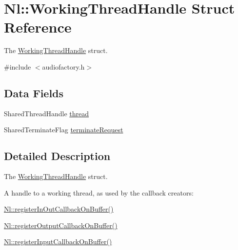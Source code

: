 \hypertarget{structNl_1_1WorkingThreadHandle}{\section{Nl\-:\-:Working\-Thread\-Handle Struct Reference}
\label{structNl_1_1WorkingThreadHandle}
}


The \hyperlink{structNl_1_1WorkingThreadHandle}{Working\-Thread\-Handle} struct.  




{\ttfamily \#include $<$audiofactory.\-h$>$}

\subsection*{Data Fields}
\begin{DoxyCompactItemize}
\item 
Shared\-Thread\-Handle \hyperlink{structNl_1_1WorkingThreadHandle_a8f3a12233057ef18fd8a23e0fe115223}{thread}
\item 
Shared\-Terminate\-Flag \hyperlink{structNl_1_1WorkingThreadHandle_aeaff58df70b1f63bd8a01334cb11eb93}{terminate\-Request}
\end{DoxyCompactItemize}


\subsection{Detailed Description}
The \hyperlink{structNl_1_1WorkingThreadHandle}{Working\-Thread\-Handle} struct. 

A handle to a working thread, as used by the callback creators\-:
\begin{DoxyItemize}
\item \hyperlink{group__Factory_ga3ef0d21bb158983dbb7fb10025f4c7df}{Nl\-::register\-In\-Out\-Callback\-On\-Buffer()}
\item \hyperlink{group__Factory_gaed5af7fdb6d3ff5d85b1f7dcdf72cb39}{Nl\-::register\-Output\-Callback\-On\-Buffer()}
\item \hyperlink{group__Factory_ga6cf9a9665bab65d08ad772de912c0012}{Nl\-::register\-Input\-Callback\-On\-Buffer()} 
\end{DoxyItemize}

